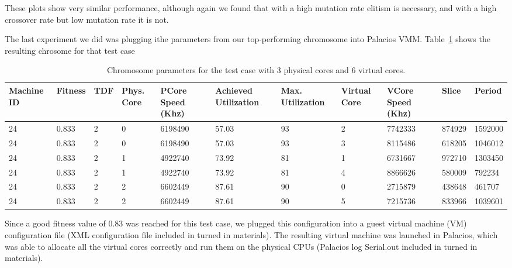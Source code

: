 \documentclass[11pt]{article}
\begin{document}
These plots show very similar performance, although again we found that with a high mutation rate elitism is necessary, and with a high crossover rate but low mutation rate it is not.

The last experiment we did was plugging ithe parameters from our top-performing chromosome into Palacios VMM. Table~\ref{tab:table1} shows the resulting chrosome for that test case

\begin{table}[H]
\centering
\begin{footnotesize}
\renewcommand{\arraystretch}{1.2}

 \begin{tabularx}{17cm}{ | X | X | X | X | X | X | X | X | X | X | X |}
 \hline
Machine ID & Fitness & TDF  & Phys. Core & PCore Speed (Khz) & Achieved Utilization & Max. Utilization & Virtual Core& VCore Speed (Khz) & Slice & Period \\ \hline

24 & 0.833 & 2 & 0 & 6198490 & 57.03 & 93 & 2 & 7742333 & 874929 & 1592000 \\ \hline
24 & 0.833 & 2 & 0 & 6198490 & 57.03 & 93 & 3 & 8115486 & 618205 & 1046012 \\ \hline

24 & 0.833 & 2 & 1 & 4922740 & 73.92 & 81 & 1 & 6731667 & 972710 & 1303450 \\ \hline
24 & 0.833 & 2 & 1 & 4922740 & 73.92 & 81 & 4 & 8866626 & 580009 & 792234 \\ \hline

24 & 0.833 & 2 & 2 & 6602449 & 87.61 & 90 & 0 & 2715879 & 438648 & 461707 \\ \hline
24 & 0.833 & 2 & 2 & 6602449 & 87.61 & 90 & 5 & 7215736 & 833966 & 1039601 \\ \hline

\end{tabularx}
\caption{Chromosome parameters for the test case with 3 physical cores and 6 virtual cores.} \label{tab:table1}
\end{footnotesize}
\end{table}

Since a good fitness value of 0.83 was reached for this test case, we plugged this configuration into a guest virtual machine (VM) configuration file (XML configuration file included in turned in materials). The resulting virtual machine was launched in Palacios, which was able to allocate all the virtual cores correctly and run them on the physical CPUs (Palacios log Serial.out included in turned in materials). 
\end{document}
